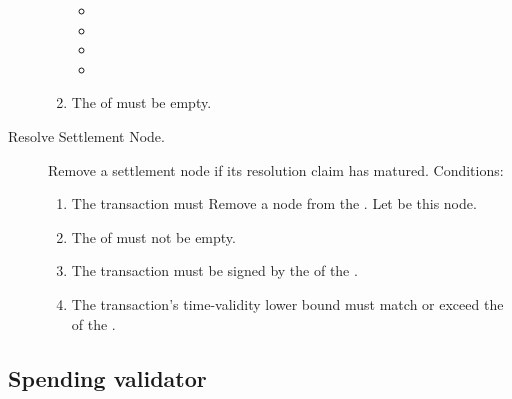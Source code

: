 \documentclass[../midgard.tex]{subfiles}
\begin{document}
\begin{description}
\begin{enumerate}
\begin{itemize}
            \item {}
            \item {}
            \item {}
            \item {}
          \end{itemize}
        \item The  of  must be empty.
      \end{enumerate}
  \item[Resolve Settlement Node.] Remove a settlement node if its resolution claim has matured.
    Conditions:
      \begin{enumerate}
        \item The transaction must Remove a node from the .
          Let  be this node.
        \item The  of  must not be empty.
        \item The transaction must be signed by the  of the .
        \item The transaction's time-validity lower bound must match or exceed the  of the .
      \end{enumerate}
\end{description}

\subsection{Spending validator}
\label{h:settlement-queue-spending-validator}
\end{document}
